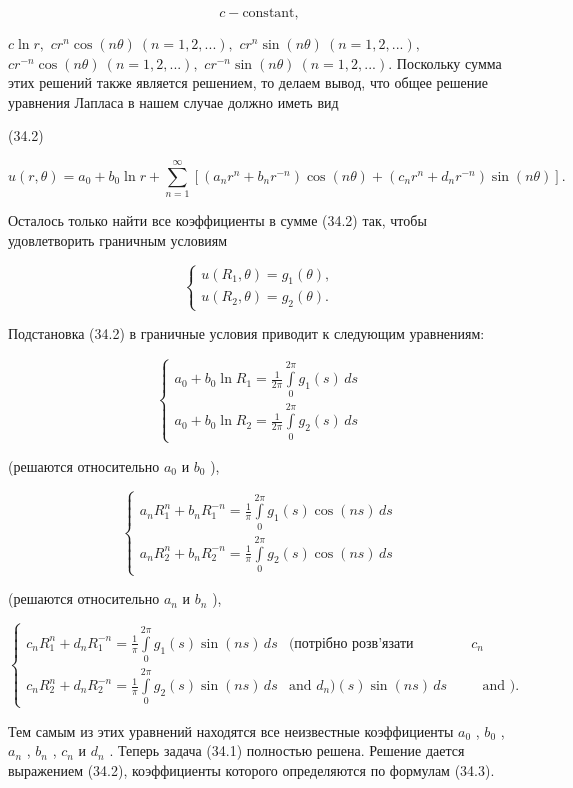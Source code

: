 \documentclass[
  ukrainian,
]{article}
\begin{document}
\[
c - \text{constant},
\]

\(c \ln r,\) \(cr^n \cos(n\theta) \ (n = 1, 2, ...),\)
\(cr^n \sin(n\theta) \ (n = 1, 2, ...),\)
\(cr^{-n} \cos(n\theta) \ (n = 1, 2, ...),\)
\(cr^{-n} \sin(n\theta) \ (n = 1, 2, ...).\) Поскольку сумма этих
решений также является решением, то делаем вывод, что общее решение
уравнения Лапласа в нашем случае должно иметь вид

(34.2)

\[
u(r, \theta) = a_0 + b_0 \ln r + \sum_{n=1}^{\infty} \left[ (a_n r^n + b_n r^{-n}) \cos(n\theta) + (c_n r^n + d_n r^{-n}) \sin(n\theta) \right].
\]

Осталось только найти все коэффициенты в сумме (34.2) так, чтобы
удовлетворить граничным условиям

\[
\begin{cases} u(R_1, \theta) = g_1(\theta), \\ u(R_2, \theta) = g_2(\theta). \end{cases}
\]

Подстановка (34.2) в граничные условия приводит к следующим уравнениям:

\[
\begin{cases} a_0 + b_0 \ln R_1 = \frac{1}{2\pi} \int\limits_0^{2\pi} g_1(s) \, ds \\ a_0 + b_0 \ln R_2 = \frac{1}{2\pi} \int\limits_0^{2\pi} g_2(s) \, ds \end{cases}
\]

(решаются относительно \(a_0\) и \(b_0\) ),

\[
\begin{cases} a_n R_1^n + b_n R_1^{-n} = \frac{1}{\pi} \int\limits_0^{2\pi} g_1(s) \cos(ns) \, ds \\ a_n R_2^n + b_n R_2^{-n} = \frac{1}{\pi} \int\limits_0^{2\pi} g_2(s) \cos(ns) \, ds \end{cases}
\]

(решаются относительно \(a_n\) и \(b_n\) ),

\[
\begin{cases} c_n R_1^n + d_n R_1^{-n} = \frac{1}{\pi} \int\limits_0^{2\pi} g_1(s) \sin{(ns)} \, ds & \text{(потрібно розв'язати відносно } c_n \\ c_n R_2^n + d_n R_2^{-n} = \frac{1}{\pi} \int\limits_0^{2\pi} g_2(s) \sin{(ns)} \, ds & \text{and } d_n \text{)} (s) \sin{(ns)} \, ds & \text{and }  \text{)}. \end{cases}
\]

Тем самым из этих уравнений находятся все неизвестные коэффициенты
\(a_0\) , \(b_0\) , \(a_n\) , \(b_n\) , \(c_n\) и \(d_n\) . Теперь
задача (34.1) полностью решена. Решение дается выражением (34.2),
коэффициенты которого определяются по формулам (34.3).
\end{document}
